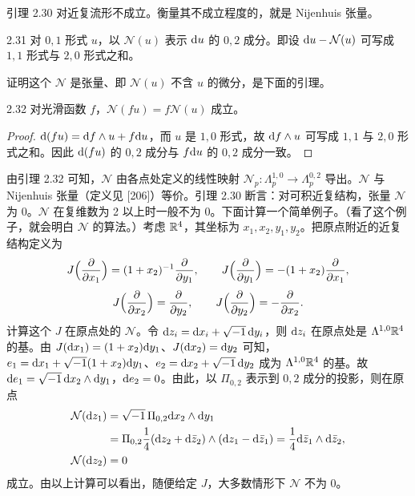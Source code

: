 引理 2.30 对近复流形不成立。衡量其不成立程度的，就是 Nijenhuis 张量。

\begin{definition}{2.31}
  对 $0,1$ 形式 $u$，以 $\mathcal{N}(u)$ 表示 $\mathrm{d} u$ 的 $0,2$ 成分。即设 $\mathrm{d} u-\mathcal{N}(u)$ 可写成 $1,1$ 形式与 $2,0$ 形式之和。
\end{definition}

证明这个 $\mathcal{N}$ 是张量、即 $\mathcal{N}(u)$ 不含 $u$ 的微分，是下面的引理。

\begin{lemma*}{2.32}
  对光滑函数 $f$，$\mathcal{N}(fu)=f\mathcal{N}(u)$ 成立。
\end{lemma*}

\begin{proof}
  $\mathrm{d}(fu)=\mathrm{d} f\wedge u+f\mathrm{d} u$，而 $u$ 是 $1,0$ 形式，故 $\mathrm{d} f\wedge u$ 可写成 $1,1$ 与 $2,0$ 形式之和。因此 $\mathrm{d}(fu)$ 的 $0,2$ 成分与 $f\mathrm{d} u$ 的 $0,2$ 成分一致。
\end{proof}

由引理 2.32 可知，$\mathcal{N}$ 由各点处定义的线性映射 $\mathcal{N}_p\colon\Lambda_p^{1,0}\to\Lambda_p^{0,2}$ 导出。$\mathcal{N}$ 与 Nijenhuis 张量（定义见 [206]）等价。引理 2.30 断言：对可积近复结构，张量 $\mathcal{N}$ 为 0。$\mathcal{N}$ 在复维数为 2 以上时一般不为 0。下面计算一个简单例子。（看了这个例子，就会明白 $\mathcal{N}$ 的算法。）考虑 $\mathbb{R}^4$，其坐标为 $x_1,x_2,y_1,y_2$。把原点附近的近复结构定义为
\[
  J\Bigl(\frac{\partial}{\partial x_1}\Bigr)=(1+x_2)^{-1}\frac{\partial}{\partial y_1},\qquad
  J\Bigl(\frac{\partial}{\partial y_1}\Bigr)=-(1+x_2)\frac{\partial}{\partial x_1},
\]
\[
  J\Bigl(\frac{\partial}{\partial x_2}\Bigr)=\frac{\partial}{\partial y_2},\qquad
  J\Bigl(\frac{\partial}{\partial y_2}\Bigr)=-\frac{\partial}{\partial x_2}.
\]
计算这个 $J$ 在原点处的 $\mathcal{N}$。令 $\mathrm{d} z_i=\mathrm{d} x_i+\sqrt{-1}\,\mathrm{d} y_i$，则 $\mathrm{d} z_i$ 在原点处是 $\Lambda^{1,0}\mathbb{R}^4$ 的基。由 $J(\mathrm{d} x_1)=(1+x_2)\mathrm{d} y_1$、$J(\mathrm{d} x_2)=\mathrm{d} y_2$ 可知，$e_1=\mathrm{d} x_1+\sqrt{-1}(1+x_2)\mathrm{d} y_1$、$e_2=\mathrm{d} x_2+\sqrt{-1}\,\mathrm{d} y_2$ 成为 $\Lambda^{1,0}\mathbb{R}^4$ 的基。故 $\mathrm{d} e_1=\sqrt{-1}\,\mathrm{d} x_2\wedge\mathrm{d} y_1$，$\mathrm{d} e_2=0$。由此，以 $\Pi_{0,2}$ 表示到 $0,2$ 成分的投影，则在原点
\begin{align*}
  \mathcal{N}(\mathrm{d} z_1)&=\sqrt{-1}\,\Pi_{0,2}\mathrm{d} x_2\wedge\mathrm{d} y_1\\
  &=\Pi_{0,2}\frac14(\mathrm{d} z_2+\mathrm{d}\bar z_2)\wedge(\mathrm{d} z_1-\mathrm{d}\bar z_1)=\frac14\mathrm{d}\bar z_1\wedge\mathrm{d}\bar z_2,\\
  \mathcal{N}(\mathrm{d} z_2)&=0
\end{align*}
成立。由以上计算可以看出，随便给定 $J$，大多数情形下 $\mathcal{N}$ 不为 0。

